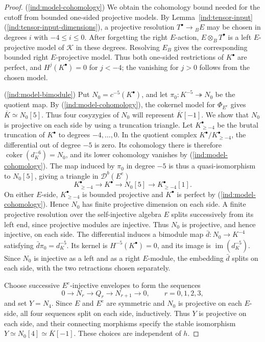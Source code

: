 \documentclass[11pt]{article}
\begin{document}
\begin{proof}
\textup{(\ref{ind:model-cohomology})} We obtain the cohomology bound needed for the cutoff
from bounded one-sided projective models.
By Lemma~\ref{ind:tensor-input}\textup{(\ref{ind:tensor-input-dimensions})}, a projective resolution
$T^\bullet\to{}_BE$ may be chosen in degrees $i$ with $-4\leq i\leq 0$.
After forgetting the right $E$-action, $E\otimes_BT^\bullet$ is a
left $E$-projective model of $\mathcal K$ in these degrees.
Resolving $E_B$ gives the corresponding bounded right $E$-projective
model. Thus both one-sided restrictions of $K^\bullet$ are perfect,
and $H^j(K^\bullet)=0$ for $j<-4$; the vanishing for $j>0$ follows
from the chosen model.

\textup{(\ref{ind:model-bimodule})} Put $N_0=c^{-5}(K^\bullet)$, and let
$\pi_0:K^{-5}\twoheadrightarrow N_0$ be the quotient map.
By \textup{(\ref{ind:model-cohomology})}, the cokernel model for $\Phi_{E^e}$ gives
$\overline K\simeq N_0[5]$.
Thus four cosyzygies of $N_0$ will represent $\overline K[-1]$.
We show that $N_0$ is projective on each side by using a truncation
triangle. Let $K_{\ge-4}^\bullet$ be the brutal truncation of $K^\bullet$
to degrees $-4,\ldots,0$. In the quotient complex
$K^\bullet/K_{\ge-4}^\bullet$, the differential out of degree $-5$
is zero. Its cohomology there is therefore
$\operatorname{coker}(d_K^{-6})=N_0$, and its lower cohomology
vanishes by \textup{(\ref{ind:model-cohomology})}. The map induced by $\pi_0$ in degree $-5$
is thus a quasi-isomorphism to $N_0[5]$, giving a triangle in
$\mathscr D^b(E^e)$
\[
 K_{\ge-4}^\bullet\longrightarrow K^\bullet\longrightarrow N_0[5]
 \longrightarrow K_{\ge-4}^\bullet[1].
\]
On either $E$-side, $K_{\ge-4}^\bullet$ is bounded projective and $K^\bullet$
is perfect by \textup{(\ref{ind:model-cohomology})}. Hence $N_0$ has finite projective
dimension on each side. A finite projective resolution over the
self-injective algebra $E$ splits successively from its left end,
since projective modules are injective. Thus $N_0$ is projective,
and hence injective, on each side.
The differential induces a bimodule map
$\bar d:N_0\to K^{-4}$ satisfying $\bar d\pi_0=d_K^{-5}$.
Its kernel is $H^{-5}(K^\bullet)=0$, and its image is
$\operatorname{im}(d_K^{-5})$. Since $N_0$ is injective as a left and as a right $E$-module,
the embedding $\bar d$ splits on each side, with the two retractions chosen separately.

Choose successive $E^e$-injective envelopes to form the sequences
\[
 0\longrightarrow N_r\longrightarrow Q_r
   \longrightarrow N_{r+1}\longrightarrow0,
 \qquad r=0,1,2,3,
\]
and set $Y=N_4$.
Since $E$ and $E^e$ are symmetric and $N_0$ is projective on each $E$-side,
all four sequences split on each side, inductively. Thus $Y$ is
projective on each side, and their connecting morphisms specify
the stable isomorphism
$Y\simeq N_0[4]\simeq \overline K[-1]$.
These choices are independent of $h$.


\end{proof}
\end{document}
